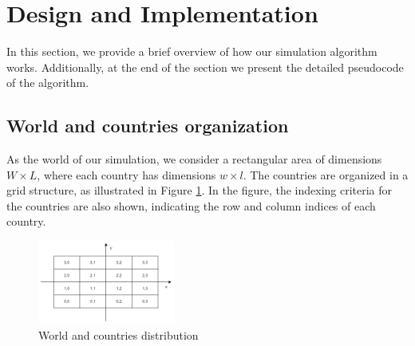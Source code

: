 \documentclass[11pt]{article}
\begin{document}
\section{Design and Implementation}
In this section, we provide a brief overview of how our simulation algorithm works. Additionally, at the end of the section we present the detailed pseudocode of the algorithm.
\subsection{World and countries organization}
As the world of our simulation, we consider a rectangular area of dimensions \(W \times L\), where each country has dimensions \(w \times l\). The countries are organized in a grid structure, as illustrated in Figure \ref{fig:world}. In the figure, the indexing criteria for the countries are also shown, indicating the row and column indices of each country.
\begin{figure}[h]
    \centering
    \label{fig:world}
    \includegraphics[width=0.4\textwidth]{resources/world.png}
    \caption{World and countries distribution}
\end{figure}
\end{document}
